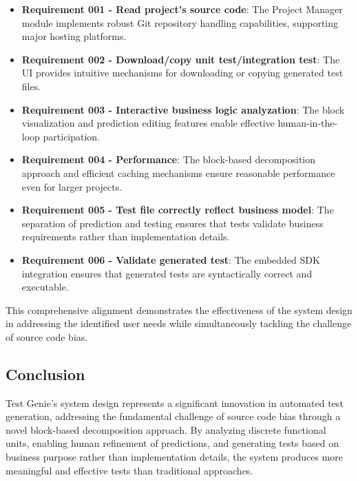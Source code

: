 \begin{itemize}
    \item \textbf{Requirement 001 - Read project's source code}: The Project Manager module implements robust Git repository handling capabilities, supporting major hosting platforms.
    
    \item \textbf{Requirement 002 - Download/copy unit test/integration test}: The UI provides intuitive mechanisms for downloading or copying generated test files.
    
    \item \textbf{Requirement 003 - Interactive business logic analyzation}: The block visualization and prediction editing features enable effective human-in-the-loop participation.
    
    \item \textbf{Requirement 004 - Performance}: The block-based decomposition approach and efficient caching mechanisms ensure reasonable performance even for larger projects.
    
    \item \textbf{Requirement 005 - Test file correctly reflect business model}: The separation of prediction and testing ensures that tests validate business requirements rather than implementation details.
    
    \item \textbf{Requirement 006 - Validate generated test}: The embedded SDK integration ensures that generated tests are syntactically correct and executable.
\end{itemize}

\hspace{0.5cm}This comprehensive alignment demonstrates the effectiveness of the system design in addressing the identified user needs while simultaneously tackling the challenge of source code bias.
 
\subsection{Conclusion}

\hspace{0.5cm}Test Genie's system design represents a significant innovation in automated test generation, addressing the fundamental challenge of source code bias through a novel block-based decomposition approach. By analyzing discrete functional units, enabling human refinement of predictions, and generating tests based on business purpose rather than implementation details, the system produces more meaningful and effective tests than traditional approaches.


